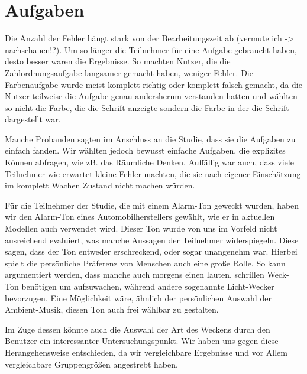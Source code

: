 \section{Aufgaben}

Die Anzahl der Fehler hängt stark von der Bearbeitungszeit ab (vermute ich -> nachschauen!?). 
Um so länger die Teilnehmer für eine Aufgabe gebraucht haben, desto besser waren die Ergebnisse. 
So machten Nutzer, die die Zahlordnungsaufgabe langsamer gemacht haben, weniger Fehler. 
Die Farbenaufgabe wurde meist komplett richtig oder komplett falsch gemacht, da die Nutzer teilweise die Aufgabe genau andersherum verstanden hatten und wählten so nicht die Farbe, die die Schrift anzeigte sondern die Farbe in der die Schrift dargestellt war.

Manche Probanden sagten im Anschluss an die Studie, dass sie die Aufgaben zu einfach fanden. 
Wir wählten jedoch bewusst einfache Aufgaben, die explizites Können abfragen, wie zB. das Räumliche Denken. 
Auffällig war auch, dass viele Teilnehmer wie erwartet kleine Fehler machten, die sie nach eigener Einschätzung im komplett Wachen Zustand nicht machen würden. 

Für die Teilnehmer der Studie, die mit einem Alarm-Ton geweckt wurden, haben wir den Alarm-Ton eines Automobilherstellers gewählt, wie er in aktuellen Modellen auch verwendet wird.
Dieser Ton wurde von uns im Vorfeld nicht ausreichend evaluiert, was manche Aussagen der Teilnehmer widerspiegeln.
Diese sagen, dass der Ton entweder erschreckend, oder sogar unangenehm war.
Hierbei spielt die persönliche Präferenz von Menschen auch eine große Rolle. So kann argumentiert werden, dass manche auch morgens einen lauten, schrillen Weck-Ton benötigen um aufzuwachen, während andere sogenannte Licht-Wecker bevorzugen. Eine Möglichkeit wäre, ähnlich der persönlichen Auswahl der Ambient-Musik, diesen Ton auch frei wählbar zu gestalten. 

Im Zuge dessen könnte auch die Auswahl der Art des Weckens durch den Benutzer ein interessanter Untersuchungspunkt. Wir haben uns gegen diese Herangehensweise entschieden, da wir vergleichbare Ergebnisse und vor Allem vergleichbare Gruppengrößen angestrebt haben.

